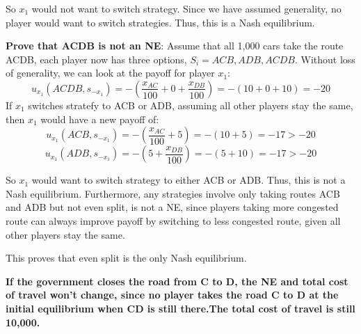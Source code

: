 \documentclass[11pt]{article} %
\begin{document}
\begin{itemize}
So $x_1$ would not want to switch strategy. Since we have assumed generality, no player would want to switch strategies. Thus, this is a Nash equilibrium.

\textbf{Prove that ACDB is not an NE}: Assume that all 1,000 cars take the route ACDB,  each player now has three options, $S_i={ACB, ADB, ACDB}$.  Without loss of generality, we can look at the payoff for player $x_1$:
$$u_{x_1}(ACDB, s_{-x_1})= -(\frac{x_{AC}}{100}+0+\frac{x_{DB}}{100})=-(10+0+10) = -20$$
If $x_1$ switches stratefy to ACB or ADB, assuming all other players stay the same, then $x_1$ would have a new payoff of:
$$u_{x_1}(ACB, s_{-x_1})= -(\frac{x_{AC}}{100}+5)=-(10+5) = -17 >-20$$
$$u_{x_1}(ADB, s_{-x_1})= -(5+\frac{x_{DB}}{100})=-(5+10) = -17 >-20$$

So $x_1$ would want to switch strategy to either ACB or ADB. Thus, this is not a Nash equilibrium. Furthermore, any strategies involve only taking routes ACB and ADB but not even split, is not a NE, since players taking more congested route can always improve payoff by switching to less congested route, given all other players stay the same.

 This proves that even split is the only Nash equilibrium.

\textbf{If the government closes the road from C to D, the NE and total cost of travel won't change, since no player takes the road C to D at the initial equilibrium when CD is still there.The total cost of travel is still 10,000. }


\end{itemize}

 
\end{document}
